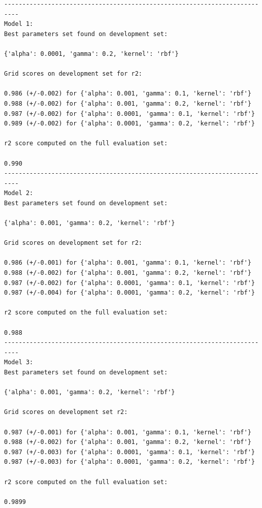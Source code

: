 \begin{verbatim}
--------------------------------------------------------------------------
Model 1:
Best parameters set found on development set:

{'alpha': 0.0001, 'gamma': 0.2, 'kernel': 'rbf'}

Grid scores on development set for r2:

0.986 (+/-0.002) for {'alpha': 0.001, 'gamma': 0.1, 'kernel': 'rbf'}
0.988 (+/-0.002) for {'alpha': 0.001, 'gamma': 0.2, 'kernel': 'rbf'}
0.987 (+/-0.002) for {'alpha': 0.0001, 'gamma': 0.1, 'kernel': 'rbf'}
0.989 (+/-0.002) for {'alpha': 0.0001, 'gamma': 0.2, 'kernel': 'rbf'}

r2 score computed on the full evaluation set:

0.990
--------------------------------------------------------------------------
Model 2:
Best parameters set found on development set:

{'alpha': 0.001, 'gamma': 0.2, 'kernel': 'rbf'}

Grid scores on development set for r2:

0.986 (+/-0.001) for {'alpha': 0.001, 'gamma': 0.1, 'kernel': 'rbf'}
0.988 (+/-0.002) for {'alpha': 0.001, 'gamma': 0.2, 'kernel': 'rbf'}
0.987 (+/-0.002) for {'alpha': 0.0001, 'gamma': 0.1, 'kernel': 'rbf'}
0.987 (+/-0.004) for {'alpha': 0.0001, 'gamma': 0.2, 'kernel': 'rbf'}

r2 score computed on the full evaluation set:

0.988
--------------------------------------------------------------------------
Model 3:
Best parameters set found on development set:

{'alpha': 0.001, 'gamma': 0.2, 'kernel': 'rbf'}

Grid scores on development set r2:

0.987 (+/-0.001) for {'alpha': 0.001, 'gamma': 0.1, 'kernel': 'rbf'}
0.988 (+/-0.002) for {'alpha': 0.001, 'gamma': 0.2, 'kernel': 'rbf'}
0.987 (+/-0.003) for {'alpha': 0.0001, 'gamma': 0.1, 'kernel': 'rbf'}
0.987 (+/-0.003) for {'alpha': 0.0001, 'gamma': 0.2, 'kernel': 'rbf'}

r2 score computed on the full evaluation set:

0.9899

\end{verbatim}
